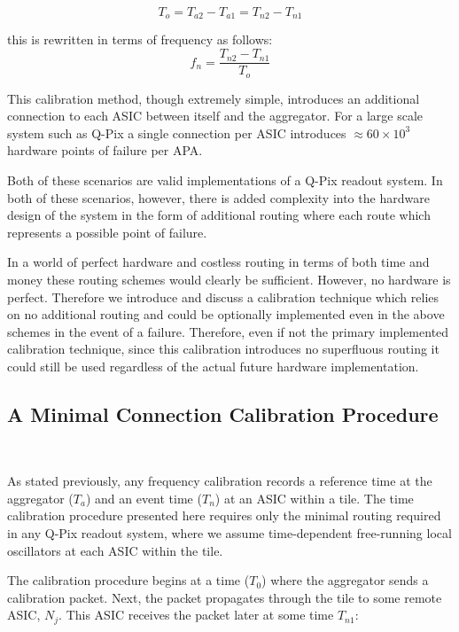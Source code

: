 \begin{equation}
  T_{o} = T_{a2} - T_{a1} = T_{n2} - T_{n1}
\end{equation}

this is rewritten in terms of frequency as follows:
\begin{equation}
  f_{n} = \frac{T_{n2} - T_{n1}}{T_{o}}
\end{equation}

This calibration method, though extremely simple, introduces an additional connection to each ASIC between itself and the aggregator.
For a large scale system such as Q-Pix a single connection per ASIC introduces $\approx 60\times 10^{3}$ hardware points of failure per APA.

Both of these scenarios are valid implementations of a Q-Pix readout system.
In both of these scenarios, however, there is added complexity into the hardware design of the system in the form of additional routing where each route which represents a possible point of failure.

In a world of perfect hardware and costless routing in terms of both time and money these routing schemes would clearly be sufficient.
However, no hardware is perfect.
Therefore we introduce and discuss a calibration technique which relies on no additional routing and could be optionally implemented even in the above schemes in the event of a failure.
Therefore, even if not the primary implemented calibration technique, since this calibration introduces no superfluous routing it could still be used regardless of the actual future hardware implementation.

\subsection{A Minimal Connection Calibration Procedure}~\label{sec:min_calib}

As stated previously, any frequency calibration records a reference time at the aggregator ($T_{a}$) and an event time ($T_{n}$) at an ASIC within a tile.
The time calibration procedure presented here requires only the minimal routing required in any Q-Pix readout system, where we assume time-dependent free-running local oscillators at each ASIC within the tile.

The calibration procedure begins at a time ($T_{0}$) where the aggregator sends a calibration packet.
Next, the packet propagates through the tile to some remote ASIC, $N_{j}$.
This ASIC receives the packet later at some time $T_{n1}$:

